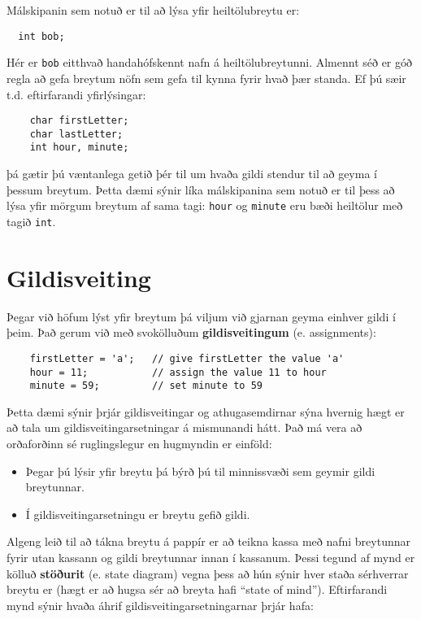 
Málskipanin sem notuð er til að lýsa yfir heiltölubreytu er: 

\begin{verbatim}
  int bob;
\end{verbatim}
%
Hér er {\tt bob} eitthvað handahófskennt nafn á heiltölubreytunni.
Almennt séð er góð regla að gefa breytum nöfn sem gefa til kynna fyrir hvað þær standa.
Ef þú sæir t.d. eftirfarandi yfirlýsingar: 

\begin{verbatim}
    char firstLetter;
    char lastLetter;
    int hour, minute;
\end{verbatim}
%
þá gætir þú væntanlega getið þér til um hvaða gildi stendur til að geyma í þessum breytum.
Þetta dæmi sýnir líka málskipanina sem notuð er til þess að lýsa yfir mörgum breytum af sama tagi: {\tt hour} og {\tt minute}
eru bæði heiltölur með tagið {\tt int}.

\section{Gildisveiting}

Þegar við höfum lýst yfir breytum þá viljum við gjarnan geyma einhver gildi í þeim.
Það gerum við með svokölluðum {\bf gildisveitingum} (e. assignments):

\begin{verbatim}
    firstLetter = 'a';   // give firstLetter the value 'a'
    hour = 11;           // assign the value 11 to hour
    minute = 59;         // set minute to 59
\end{verbatim}
%
Þetta dæmi sýnir þrjár gildisveitingar og athugasemdirnar sýna hvernig hægt er að tala um gildisveitingarsetningar á mismunandi hátt.
Það má vera að orðaforðinn sé ruglingslegur en hugmyndin er einföld: 

\begin{itemize}
\item Þegar þú lýsir yfir breytu þá býrð þú til minnissvæði sem geymir gildi breytunnar.
\item Í gildisveitingarsetningu er breytu gefið gildi. 
\end{itemize}

Algeng leið til að tákna breytu á pappír er að teikna kassa
með nafni breytunnar fyrir utan kassann og gildi breytunnar innan í kassanum.
Þessi tegund af mynd er kölluð {\bf stöðurit} (e. state diagram) vegna þess að hún sýnir hver staða sérhverrar breytu er (hægt er að hugsa sér að breyta hafi ``state of mind'').
Eftirfarandi mynd sýnir hvaða áhrif gildisveitingarsetningarnar þrjár hafa: 

